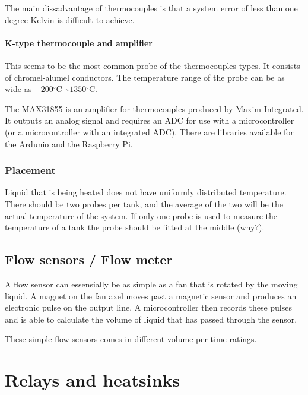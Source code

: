 \documentclass[11pt,fleqn]{book} %
\newcommand{\degree}{\ensuremath{^\circ}}
\begin{document}
The main dissadvantage of thermocouples is that a system error of less than one degree Kelvin is difficult to achieve.

\subsubsection{K-type thermocouple and amplifier}

This seems to be the most common probe of the thermocouples types. It consists of chromel-alumel conductors. The temperature range of the probe can be as wide as $-200\degree$C \textasciitilde $1350\degree$C.

The MAX31855 is an amplifier for thermocouples produced by Maxim Integrated. It outputs an analog signal and requires an ADC for use with a microcontroller (or a microcontroller with an integrated ADC). There are libraries available for the Ardunio and the Raspberry Pi. 

\subsection{Placement}

Liquid that is being heated does not have uniformly distributed temperature. There should be two probes per tank, and the average of the two will be the actual temperature of the system.
If only one probe is used to measure the temperature of a tank the probe should be fitted at the middle (why?).

\section{Flow sensors / Flow meter}

A flow sensor can essensially be as simple as a fan that is rotated by the moving liquid. A magnet on the fan axel moves past a magnetic sensor and produces an electronic pulse on the output line. A microcontroller then records these pulses and is able to calculate the volume of liquid that has passed through the sensor.

These simple flow sensors comes in different volume per time ratings. 



\chapter{Relays and heatsinks}
\end{document}
